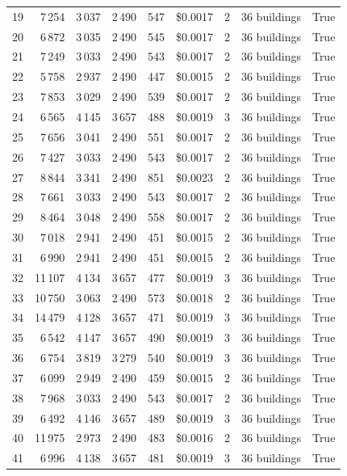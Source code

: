 \documentclass[a4paper,11pt]{article}
\begin{document}
\begin{table}[ht]
\begin{tabular}{r r r r r r r p{3cm} l}
19 & 7\,254 & 3\,037 & 2\,490 & 547 & \$0.0017 & 2 & 36 buildings & True \\
20 & 6\,872 & 3\,035 & 2\,490 & 545 & \$0.0017 & 2 & 36 buildings & True \\
21 & 7\,249 & 3\,033 & 2\,490 & 543 & \$0.0017 & 2 & 36 buildings & True \\
22 & 5\,758 & 2\,937 & 2\,490 & 447 & \$0.0015 & 2 & 36 buildings & True \\
23 & 7\,853 & 3\,029 & 2\,490 & 539 & \$0.0017 & 2 & 36 buildings & True \\
24 & 6\,565 & 4\,145 & 3\,657 & 488 & \$0.0019 & 3 & 36 buildings & True \\
25 & 7\,656 & 3\,041 & 2\,490 & 551 & \$0.0017 & 2 & 36 buildings & True \\
26 & 7\,427 & 3\,033 & 2\,490 & 543 & \$0.0017 & 2 & 36 buildings & True \\
27 & 8\,844 & 3\,341 & 2\,490 & 851 & \$0.0023 & 2 & 36 buildings & True \\
28 & 7\,661 & 3\,033 & 2\,490 & 543 & \$0.0017 & 2 & 36 buildings & True \\
29 & 8\,464 & 3\,048 & 2\,490 & 558 & \$0.0017 & 2 & 36 buildings & True \\
30 & 7\,018 & 2\,941 & 2\,490 & 451 & \$0.0015 & 2 & 36 buildings & True \\
31 & 6\,990 & 2\,941 & 2\,490 & 451 & \$0.0015 & 2 & 36 buildings & True \\
32 & 11\,107 & 4\,134 & 3\,657 & 477 & \$0.0019 & 3 & 36 buildings & True \\
33 & 10\,750 & 3\,063 & 2\,490 & 573 & \$0.0018 & 2 & 36 buildings & True \\
34 & 14\,479 & 4\,128 & 3\,657 & 471 & \$0.0019 & 3 & 36 buildings & True \\
35 & 6\,542 & 4\,147 & 3\,657 & 490 & \$0.0019 & 3 & 36 buildings & True \\
36 & 6\,754 & 3\,819 & 3\,279 & 540 & \$0.0019 & 3 & 36 buildings & True \\
37 & 6\,099 & 2\,949 & 2\,490 & 459 & \$0.0015 & 2 & 36 buildings & True \\
38 & 7\,968 & 3\,033 & 2\,490 & 543 & \$0.0017 & 2 & 36 buildings & True \\
39 & 6\,492 & 4\,146 & 3\,657 & 489 & \$0.0019 & 3 & 36 buildings & True \\
40 & 11\,975 & 2\,973 & 2\,490 & 483 & \$0.0016 & 2 & 36 buildings & True \\
41 & 6\,996 & 4\,138 & 3\,657 & 481 & \$0.0019 & 3 & 36 buildings & True \\

\end{tabular}
\end{table}
\end{document}
